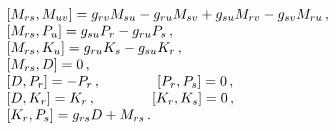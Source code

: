 \begin{equation}
 \begin{array}{l}
[M_{rs}, M_{u v}]  =
 g_{rv} M_{su} -
 g_{ru} M_{sv} + g_{su} M_{rv} - g_{sv}M_{ru}\, ,
\cr
 [M_{rs}, P_{u} ]  =
g_{su}P_r-g_{ru}P_s\, ,
 \cr
[M_{rs}, K_{u} ]  =  g_{ru}K_s-g_{su}K_r\, ,
\cr
[M_{rs} , D] = 0 \, ,
\cr
[D, P_r ]  = - P_r\, , \qquad  \qquad [P_r, P_s ]  = 0 \, ,
\cr
[D, K_r ] =  K_r\, ,  \qquad \qquad [K_r, K_s ] = 0 \, ,
\cr
[K_r, P_s ] =   g_{rs} D + M_{rs} \, .
 \end{array}
\end{equation}

